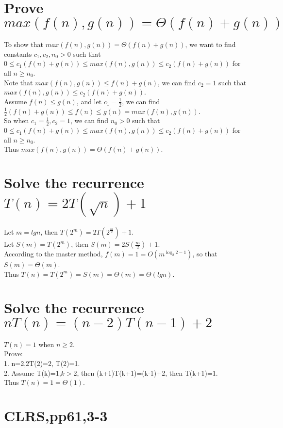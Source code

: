 \documentclass{article}
\begin{document}
\section{Prove $max(f(n),g(n))=\Theta(f(n)+g(n))$}
To show that $max(f(n),g(n))=\Theta(f(n)+g(n))$, we want to find constants $c_1,c_2,n_0>0$ such that $0 \le c_1(f(n)+g(n)) \le max(f(n),g(n)) \le c_2(f(n)+g(n))$ for all $n \ge n_0$.\\
Note that $max(f(n),g(n)) \le f(n)+g(n)$, we can find $c_2=1$ such that $ max(f(n),g(n)) \le c_2(f(n)+g(n))$.\\
Assume $f(n)\le g(n)$, and let $c_1=\frac{1}{2}$, we can find $\frac{1}{2}(f(n)+g(n)) \le f(n) \le g(n) = max(f(n),g(n))$.\\
So when $c_1=\frac{1}{2}, c_2=1$, we can find $n_0>0$ such that $0 \le c_1(f(n)+g(n)) \le max(f(n),g(n)) \le c_2(f(n)+g(n))$ for all $n \ge n_0$.\\
Thus $max(f(n),g(n))=\Theta(f(n)+g(n))$.
\section{Solve the recurrence $T(n)=2T(\sqrt{n})+1$}
Let $m=lgn$, then $T(2^m)=2T(2^\frac{m}{2})+1$.\\
Let $S(m)=T(2^m)$, then $S(m)=2S(\frac{m}{2})+1$.\\
According to the master method, $f(m)=1=O(m^{\log _{2}{2-1}})$, so that $S(m)=\Theta(m)$.\\
Thus $T(n)=T(2^m)=S(m)=\Theta(m)=\Theta(lgn)$.
\section{Solve the recurrence $nT(n)=(n-2)T(n-1)+2$}
$T(n)=1$ when $n \ge 2.$\\
Prove:\\
1. n=2,2T(2)=2, T(2)=1.\\
2. Assume T(k)=1,$k>2$, then (k+1)T(k+1)=(k-1)+2, then T(k+1)=1.\\
Thus $T(n)=1=\Theta(1)$.
\section{CLRS,pp61,3-3}
\end{document}
